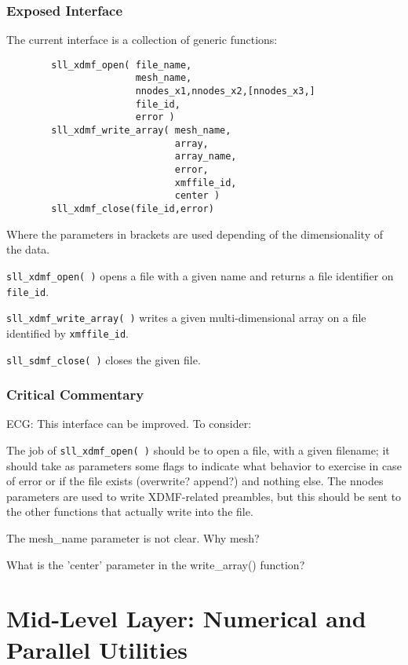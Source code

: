 \documentclass[]{report}   %
\begin{document}
    \subsection{Exposed Interface}
    The current interface is a collection of generic functions:
    \begin{verbatim}
        sll_xdmf_open( file_name,
                       mesh_name,
                       nnodes_x1,nnodes_x2,[nnodes_x3,]
                       file_id,
                       error )
        sll_xdmf_write_array( mesh_name,
                              array,
                              array_name,
                              error,
                              xmffile_id,
                              center )
        sll_xdmf_close(file_id,error)
    \end{verbatim}
    Where the parameters in brackets are used depending of the dimensionality of the data.
    \begin{description}
       \item \verb+sll_xdmf_open( )+ opens a file with a given name and returns a file identifier on \verb+file_id+.
       \item \verb+sll_xdmf_write_array( )+ writes a given multi-dimensional array on a file identified by \verb+xmffile_id+.
       \item \verb+sll_sdmf_close( )+ closes the given file.
    \end{description}

\subsection{Critical Commentary}
ECG: This interface can be improved. To consider:
\begin{description}
\item The job of \verb+sll_xdmf_open( )+ should be to open a file, with a given filename; it should take as parameters some flags to indicate what behavior to exercise in case of error or if the file exists (overwrite? append?) and nothing else. The nnodes parameters are used to write XDMF-related preambles, but this should be sent to the other functions that actually write into the file.
\item The mesh\_name parameter is not clear. Why mesh?
\item What is the 'center' parameter in the write\_array() function?
\end{description}

\chapter{Mid-Level Layer: Numerical and Parallel Utilities}
\end{document}
